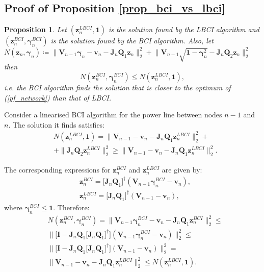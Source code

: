 \documentclass[journal,10pt,onecolumn,draftclsnofoot,]{IEEEtran}
\makeatletter
\theoremstyle{plain}
\newtheorem*{proposition*}{Proposition}
\theoremstyle{definition}
\theoremstyle{remark}
\renewenvironment{proof}[1][\proofname]{\par
  \pushQED{\qed}%
  \normalfont \topsep6\p@\@plus6\p@\relax
  \list{}{%
    \settowidth{\leftmargin}{\itshape\proofname:\hskip\labelsep}%
    \setlength{\labelwidth}{0pt}%
    \setlength{\itemindent}{-\leftmargin}%
  }%
  \item[\hskip\labelsep\itshape#1\@addpunct{:}]\ignorespaces
}{%
  \popQED\endlist\@endpefalse
}
\makeatother
\begin{document}
\subsection{Proof of Proposition \ref{prop_bci_vs_lbci}}
\begin{proposition*}
Let $(\bm{z}_n^{LBCI}, \bm{1})$ is the solution found by the LBCI algorithm and $(\bm{z}_n^{BCI}, \bm{\gamma}^{BCI}_{n})$ is the solution found by the BCI algorithm.
Also, let $N(\bm{z}_n, \bm{\gamma}_{n}) \coloneqq \big\| \bm{V}_{n-1}\bm{\gamma}_{n} - \bm{v}_{n} - \bm{J}_{n}\bm{Q}_1\bm{z}_{n} \big\|_2^2 + \big\|\bm{V}_{n-1}\sqrt{\bm{1} - \bm{\gamma}^2_{n}} - \bm{J}_{n}\bm{Q}_2\bm{z}_{n} \big\|_2^2$ then
$$N(\bm{z}_n^{BCI}, \bm{\gamma}^{BCI}_{n}) \le N(\bm{z}_n^{LBCI}, \bm{1}),$$
i.e. the BCI algorithm finds the solution that is closer to the optimum of (\ref{pf_network}) than that of LBCI.
\end{proposition*}
\begin{proof}
Consider a linearised BCI algorithm for the power line between nodes $n-1$ and $n$. The solution it finds satisfies:
\begin{equation*}
\begin{split}
{}& N(\bm{z}_n^{LBCI}, \bm{1}) = \big\| \bm{V}_{n-1} - \bm{v}_{n} - \bm{J}_{n}\bm{Q}_1\bm{z}^{LBCI}_{n} \big\|_2^2 + \\
& + \big\|\bm{J}_{n}\bm{Q}_2\bm{z}^{LBCI}_{n} \big\|_2^2 \ge \big\| \bm{V}_{n-1} - \bm{v}_{n} - \bm{J}_{n}\bm{Q}_1\bm{z}^{LBCI}_{n} \big\|_2^2.
\end{split}
\end{equation*}

The corresponding expressions for $\bm{z}_n^{BCI}$ and $\bm{z}_n^{LBCI}$ are given by:  
\begin{equation*}
\begin{split}
{}& \bm{z}_n^{BCI} = \big[ \bm{J}_{n}\bm{Q}_1 \big]^{\dagger} (\bm{V}_{n-1}\bm{\gamma}^{BCI}_{n} - \bm{v}_{n}), \\
& \bm{z}_n^{LBCI} = \big[ \bm{J}_{n}\bm{Q}_1 \big]^{\dagger} (\bm{V}_{n-1} - \bm{v}_{n}),
\end{split}
\end{equation*}
where $\bm{\gamma}^{BCI}_{n} \le \bm{1}$. Therefore:
\begin{equation*}
\begin{split}
{}& N(\bm{z}_n^{BCI}, \bm{\gamma}^{BCI}_{n}) = \big\| \bm{V}_{n-1}\bm{\gamma}^{BCI}_{n} - \bm{v}_{n} - \bm{J}_{n}\bm{Q}_1\bm{z}^{BCI}_{n} \big\|_2^2 \le\\
& \Big\|\big[ \bm{I} - \bm{J}_{n}\bm{Q}_1\big[ \bm{J}_{n}\bm{Q}_1 \big]^{\dagger}\big](\bm{V}_{n-1}\bm{\gamma}^{BCI}_{n} - \bm{v}_{n})\Big\|_2^2 \le \\
& \Big\|\big[ \bm{I} - \bm{J}_{n}\bm{Q}_1\big[ \bm{J}_{n}\bm{Q}_1 \big]^{\dagger}\big](\bm{V}_{n-1} - \bm{v}_{n})\Big\|_2^2 = \\
& \big\| \bm{V}_{n-1} - \bm{v}_{n} - \bm{J}_{n}\bm{Q}_1\bm{z}^{LBCI}_{n} \big\|_2^2 \le N(\bm{z}_n^{LBCI}, \bm{1}).
\end{split}
\end{equation*}
\end{proof}
\end{document}
